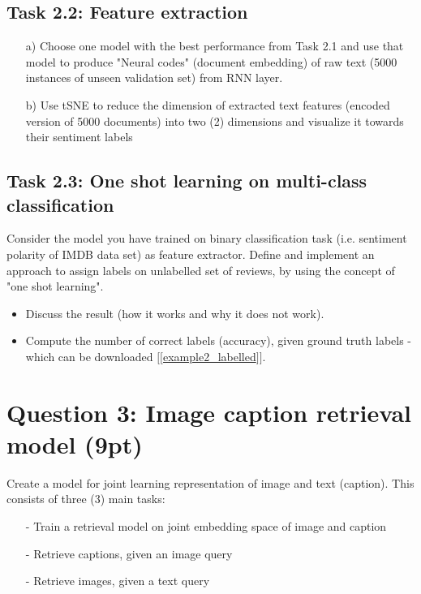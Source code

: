 \documentclass[a4paper,twoside,10pt]{article}
\begin{document}
\subsection*{Task 2.2: Feature extraction}

\begin{itemize}
  \item[a)] Choose one model with the best performance from Task 2.1 and use that model to produce "Neural codes" (document embedding) of raw text (5000 instances of unseen validation set) from RNN layer.
  
  \item[b)] Use tSNE to reduce the dimension of extracted text features (encoded version of 5000 documents) into two (2) dimensions and visualize it towards their sentiment labels
  
\end{itemize}


\subsection*{Task 2.3: One shot learning on multi-class classification}

Consider the model you have trained on binary classification task (i.e. sentiment polarity of IMDB data set) as feature extractor. Define and implement an approach to assign labels on unlabelled set of reviews, by using the concept of "one shot learning". 

\begin{itemize}
    \item Discuss the result (how it works and why it does not work).
    \item Compute the number of correct labels (accuracy), given ground truth labels - which can be downloaded \href{https://storage.googleapis.com/trl_data/example2_labelled.tsv}{$[[$example2\_labelled$]]$}.
\end{itemize}


\section*{Question 3: Image caption retrieval model (9pt)}

Create a model for joint learning representation of image and text (caption). This consists of three (3) main tasks:

\begin{itemize}
    \item[-] Train a retrieval model on joint embedding space of image and caption 
    \item[-] Retrieve captions, given an image query
    \item[-] Retrieve images, given a text query
\end{itemize}
\end{document}
